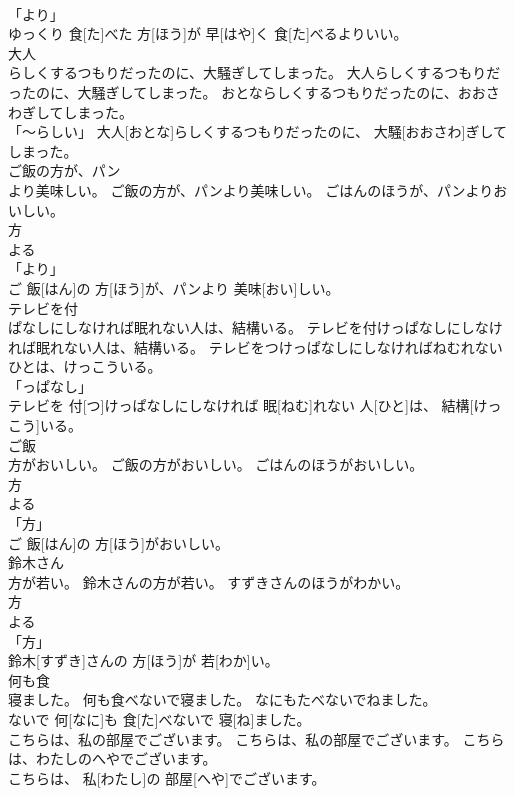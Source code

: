 \documentclass[8pt]{extreport}
\begin{document}
\begin{CJK}{UTF8}{min}
\\	「より」 
\\	ゆっくり 食[た]べた 方[ほう]が 早[はや]く 食[た]べるよりいい。		
\\	大人
\\	らしくするつもりだったのに、大騒ぎしてしまった。	大人らしくするつもりだったのに、大騒ぎしてしまった。	おとならしくするつもりだったのに、おおさわぎしてしまった。	
\\	「～らしい」	大人[おとな]らしくするつもりだったのに、 大騒[おおさわ]ぎしてしまった。		
\\	ご飯の方が、パン
\\	より美味しい。	ご飯の方が、パンより美味しい。	ごはんのほうが、パンよりおいしい。	
\\	方 
\\	よる 
\\	「より」 
\\	ご 飯[はん]の 方[ほう]が、パンより 美味[おい]しい。		
\\	テレビを付
\\	ぱなしにしなければ眠れない人は、結構いる。	テレビを付けっぱなしにしなければ眠れない人は、結構いる。	テレビをつけっぱなしにしなければねむれないひとは、けっこういる。	
\\	「っぱなし」 
\\	テレビを 付[つ]けっぱなしにしなければ 眠[ねむ]れない 人[ひと]は、 結構[けっこう]いる。		
\\	ご飯
\\	方がおいしい。	ご飯の方がおいしい。	ごはんのほうがおいしい。	
\\	方 
\\	よる 
\\	「方」 
\\	ご 飯[はん]の 方[ほう]がおいしい。		
\\	鈴木さん
\\	方が若い。	鈴木さんの方が若い。	すずきさんのほうがわかい。	
\\	方 
\\	よる 
\\	「方」 
\\	鈴木[すずき]さんの 方[ほう]が 若[わか]い。		
\\	何も食
\\	寝ました。	何も食べないで寝ました。	なにもたべないでねました。	
\\	ないで	何[なに]も 食[た]べないで 寝[ね]ました。		
\\	こちらは、私の部屋でございます。	こちらは、私の部屋でございます。	こちらは、わたしのへやでございます。	
\\	こちらは、 私[わたし]の 部屋[へや]でございます。		

\end{CJK}
\end{document}
